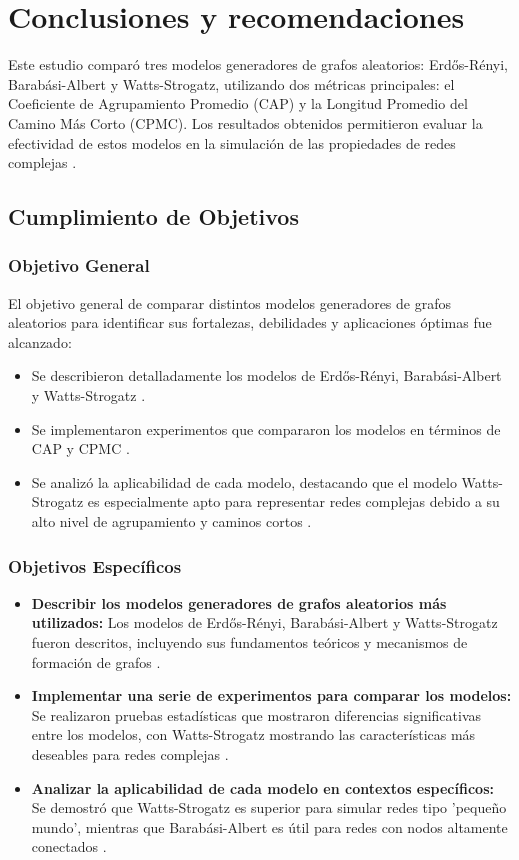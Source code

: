 \chapter{Conclusiones y recomendaciones}

Este estudio comparó tres modelos generadores de grafos aleatorios: Erdős-Rényi, Barabási-Albert y Watts-Strogatz, utilizando dos métricas principales: el Coeficiente de Agrupamiento Promedio (CAP) y la Longitud Promedio del Camino Más Corto (CPMC). Los resultados obtenidos permitieron evaluar la efectividad de estos modelos en la simulación de las propiedades de redes complejas .

\section{Cumplimiento de Objetivos}

\subsection*{Objetivo General}

El objetivo general de comparar distintos modelos generadores de grafos aleatorios para identificar sus fortalezas, debilidades y aplicaciones óptimas fue alcanzado:

\begin{itemize}
    \item Se describieron detalladamente los modelos de Erdős-Rényi, Barabási-Albert y Watts-Strogatz .
    \item Se implementaron experimentos que compararon los modelos en términos de CAP y CPMC .
    \item Se analizó la aplicabilidad de cada modelo, destacando que el modelo Watts-Strogatz es especialmente apto para representar redes complejas debido a su alto nivel de agrupamiento y caminos cortos .
\end{itemize}

\subsection*{Objetivos Específicos}

\begin{itemize}
    \item \textbf{Describir los modelos generadores de grafos aleatorios más utilizados:} Los modelos de Erdős-Rényi, Barabási-Albert y Watts-Strogatz fueron descritos, incluyendo sus fundamentos teóricos y mecanismos de formación de grafos .
    \item \textbf{Implementar una serie de experimentos para comparar los modelos:} Se realizaron pruebas estadísticas que mostraron diferencias significativas entre los modelos, con Watts-Strogatz mostrando las características más deseables para redes complejas .
    \item \textbf{Analizar la aplicabilidad de cada modelo en contextos específicos:} Se demostró que Watts-Strogatz es superior para simular redes tipo 'pequeño mundo', mientras que Barabási-Albert es útil para redes con nodos altamente conectados .
\end{itemize}

